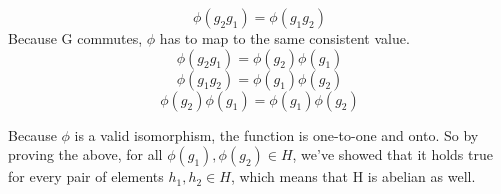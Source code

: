 \begin{enumerate}
\begin{enumerate}
      $$\phi(g_2g_1) = \phi(g_1g_2)$$
      Because G commutes, $\phi$ has to map to the same consistent value.
      $$\phi(g_2g_1) = \phi(g_2)\phi(g_1)$$
      $$\phi(g_1g_2) = \phi(g_1)\phi(g_2)$$
      $$\phi(g_2)\phi(g_1) = \phi(g_1)\phi(g_2)$$

      Because $\phi$ is a valid isomorphism, the function is one-to-one and onto. So by proving the above, for all $\phi(g_1), \phi(g_2) \in H$, we've showed that it holds true for every pair of elements $h_1, h_2 \in H$, which means that H is abelian as well.
      
    \end{enumerate}

\end{enumerate}


